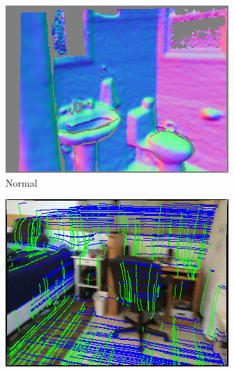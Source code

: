 \begin{figure}
\begin{minipage}{0.19\linewidth}
     \includegraphics[width=\linewidth]{FrameNet/Dataset/pred-000021-normal.png}\\
     \vspace{-0.05in}
     Normal
    \end{minipage}
     \begin{minipage}{0.19\linewidth}
     \centering
     \includegraphics[width=\linewidth]{FrameNet/Dataset/pred-000001-vis-gt.png}\\

\end{minipage}
\end{figure}
